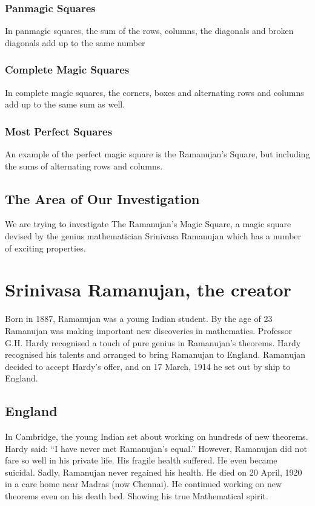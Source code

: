 \documentclass{article}
\begin{document}
\subsubsection{Panmagic Squares}
    In panmagic squares, the sum of the rows, columns, the diagonals and broken diagonals add up to the same number
\subsubsection{Complete Magic Squares}
    In complete magic squares, the corners, boxes and alternating rows and columns add up to the same sum as well.
\subsubsection{Most Perfect Squares}
    An example of the perfect magic square is the Ramanujan's Square, but including the sums of alternating rows and columns.

\subsection{The Area of Our Investigation}
We are trying to investigate The Ramanujan's Magic Square, a magic square devised by the genius mathematician Srinivasa Ramanujan which has a number of exciting properties.

\newpage
\section{Srinivasa Ramanujan, the creator}
\tab Born in 1887, Ramanujan was a young Indian student.
By the age of 23 Ramanujan was making important new discoveries in mathematics. Professor G.H. Hardy recognised a touch of pure genius in Ramanujan’s theorems. Hardy recognised his talents and arranged to bring Ramanujan to England. Ramanujan decided to accept Hardy’s offer, and on 17 March, 1914 he set out by ship to England.
\subsection{England}
In Cambridge, the young Indian set about working on hundreds of new theorems. Hardy said: “I have never met Ramanujan’s equal.”\cite{studyMagicSquare} However, Ramanujan did not fare so well in his private life. His fragile health suffered. He even became suicidal.
Sadly, Ramanujan never regained his health. He died on 20 April, 1920 in a care home near Madras (now Chennai). He continued working on new theorems even on his death bed. Showing his true Mathematical spirit.\cite{historyRamanujan}
\end{document}
